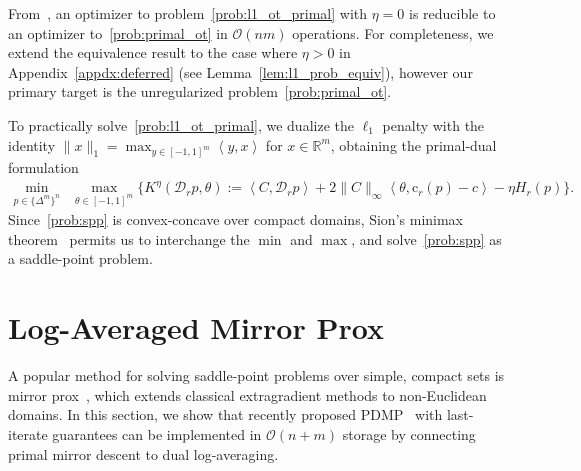 \documentclass[10pt]{article}
\newcommand{\R}{\mathbb{R}}
\newcommand{\softmax}{\operatorname{smax}}
\newcommand{\inner}[2]{\left\langle #1,#2\right\rangle}
\newcommand{\diag}[1]{\mathcal{D}_{#1}}
\theoremstyle{plain}
\theoremstyle{definition}
\theoremstyle{remark}
\newcommand{\col}{\bm{\mathrm{c}}}
\begin{document}
From~\cite[Lemma 2.3]{jambulapatiDirectTildelbraceOrbrace2019a}, an optimizer to problem~\eqref{prob:l1_ot_primal} with $\eta =0$ is reducible to an optimizer to~\eqref{prob:primal_ot} in $\mathcal{O}(nm)$ operations. For completeness, we extend the equivalence result to the case where $\eta >0$ in Appendix~\ref{appdx:deferred} (see Lemma~\ref{lem:l1_prob_equiv}), however our primary target is the unregularized problem~\eqref{prob:primal_ot}.


To practically solve~\eqref{prob:l1_ot_primal}, we dualize the $\ell_1$ penalty with the identity $\|x\|_1=\max_{y\in[-1,1]^m}\inner{y}{x}$ for $x\in\R^m$, obtaining the primal-dual formulation
\begin{align}\label{prob:spp}
    \min_{p\in\{\Delta^m\}^n}&\max_{\theta\in[-1,1]^m}\{K^{\eta }(\diag{r}p,\theta):=\inner{C}{\diag{r}p}  + 2\|C\|_\infty\inner{\theta}{\col_r(p) -c}- \eta  H_r(p)\}.
\end{align}
 Since~\eqref{prob:spp} is convex-concave over compact domains, Sion's minimax theorem~\cite{sionGeneralMinimaxTheorems1958} permits us to interchange the $\min$ and $\max$, and solve~\eqref{prob:spp} as a saddle-point problem.



\section{Log-Averaged Mirror Prox}\label{sec:lamp}
A popular method for solving saddle-point problems over simple, compact sets is mirror prox~\cite{nemirovskiProxMethodRateConvergence2006}, which extends classical extragradient methods to non-Euclidean domains. In this section, we show that recently proposed PDMP~\cite{cen2024fast,liFastComputationOptimal2025} with last-iterate guarantees can be implemented in $\mathcal{O}(n+m)$ storage by connecting primal mirror descent to dual log-averaging.
\end{document}
